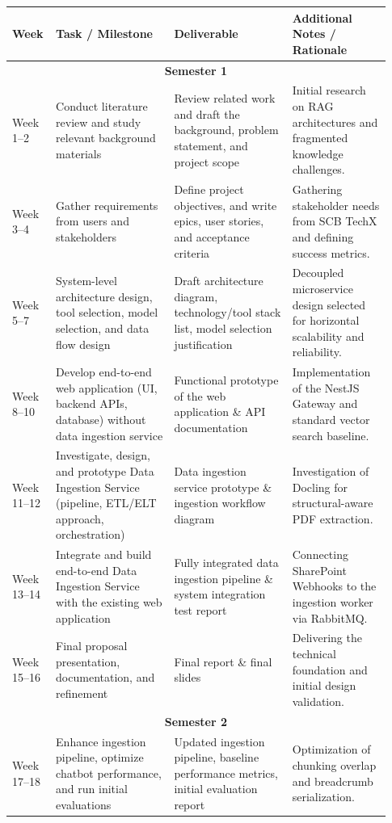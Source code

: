 \documentclass[12pt]{article}
\begin{document}
\begin{longtable}{p{0.08\linewidth} p{0.30\linewidth} p{0.30\linewidth} p{0.25\linewidth}}
\toprule
\textbf{Week} & \textbf{Task / Milestone} & \textbf{Deliverable} & \textbf{Additional Notes / Rationale} \\
\midrule
\endhead
\multicolumn{4}{c}{\textbf{Semester 1}} \\
\midrule
Week 1--2 & Conduct literature review and study relevant background materials & Review related work and draft the background, problem statement, and project scope & Initial research on RAG architectures and fragmented knowledge challenges. \\
Week 3--4 & Gather requirements from users and stakeholders & Define project objectives, and write epics, user stories, and acceptance criteria & Gathering stakeholder needs from SCB TechX and defining success metrics. \\
Week 5--7 & System-level architecture design, tool selection, model selection, and data flow design & Draft architecture diagram, technology/tool stack list, model selection justification & Decoupled microservice design selected for horizontal scalability and reliability. \\
Week 8--10 & Develop end-to-end web application (UI, backend APIs, database) without data ingestion service & Functional prototype of the web application \& API documentation & Implementation of the NestJS Gateway and standard vector search baseline. \\
Week 11--12 & Investigate, design, and prototype Data Ingestion Service (pipeline, ETL/ELT approach, orchestration) & Data ingestion service prototype \& ingestion workflow diagram & Investigation of Docling for structural-aware PDF extraction. \\
Week 13--14 & Integrate and build end-to-end Data Ingestion Service with the existing web application & Fully integrated data ingestion pipeline \& system integration test report & Connecting SharePoint Webhooks to the ingestion worker via RabbitMQ. \\
Week 15--16 & Final proposal presentation, documentation, and refinement & Final report \& final slides & Delivering the technical foundation and initial design validation. \\
\midrule
\multicolumn{4}{c}{\textbf{Semester 2}} \\
\midrule
Week 17--18 & Enhance ingestion pipeline, optimize chatbot performance, and run initial evaluations & Updated ingestion pipeline, baseline performance metrics, initial evaluation report & Optimization of chunking overlap and breadcrumb serialization. \\

\end{longtable}
\end{document}
